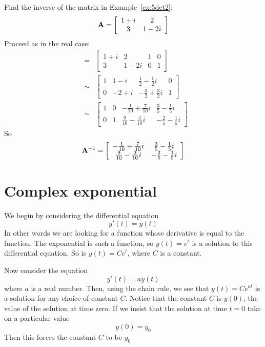 \begin{example}
\label{ex:5inverse}
Find the inverse of the matrix in Example~\ref{ex:5det2}:
\[
{\bf A} = \left[ \begin{array}{cc} 1+i & 2 \\ 3 & 1-2i \end{array} \right]
\]
Proceed as in the real case:
\begin{eqnarray*}
[ {\bf A} | {\bf I} ] & = & \left[ \begin{array}{cc|cc} 1+i & 2 & 1 & 0 \\ 3 & 1-2i & 0 & 1 \end{array} \right] \\
& \sim & \left[ \begin{array}{cc|cc} 1 & 1-i  & \frac{1}{2} - \frac{1}{2} i  & 
   0 \\ 0 & -2+i & -\frac{3}{2} + \frac{3}{2} i  & 1 \end{array} \right] \\
& \sim & \left[ \begin{array}{cc|cc} 1 & 0  & -\frac{1}{10} +\frac{7}{10} i  &  \frac{3}{5} - \frac{1}{5} i \\
   0 & 1 & \frac{9}{10} - \frac{3}{10} i  & -\frac{2}{5}-\frac{1}{5} i  \end{array} \right]
\end{eqnarray*}
So 
\[
{\bf A}^{-1} = \left[ \begin{array}{cc} -\frac{1}{10} +\frac{7}{10} i  &  \frac{3}{5} - \frac{1}{5} i \\
 \frac{9}{10} - \frac{3}{10} i  & -\frac{2}{5}-\frac{1}{5} i  \end{array} \right]
\]
\end{example} 

\section{Complex exponential}

We begin by considering the differential equation
\[
y'(t) = y(t)
\]
In other words we are looking for a function whose derivative is equal
to the function. The exponential is such a function, so $y(t)=e^t$ is
a solution to this differential equation. So is $y(t)=Ce^t$, where $C$
is a constant.

Now consider the equation
\[
y'(t) = a y(t)
\]
where $a$ is a real number. Then, using the chain rule, we see that
$y(t)=Ce^{a t}$ is a solution for any choice of constant $C$.  Notice
that the constant $C$ is $y(0)$, the value of the solution at time
zero.  If we insist that the solution at time $t=0$ take on a
particular value
\[
y(0) = y_0
\]
Then this forces the constant $C$ to be $y_0$

